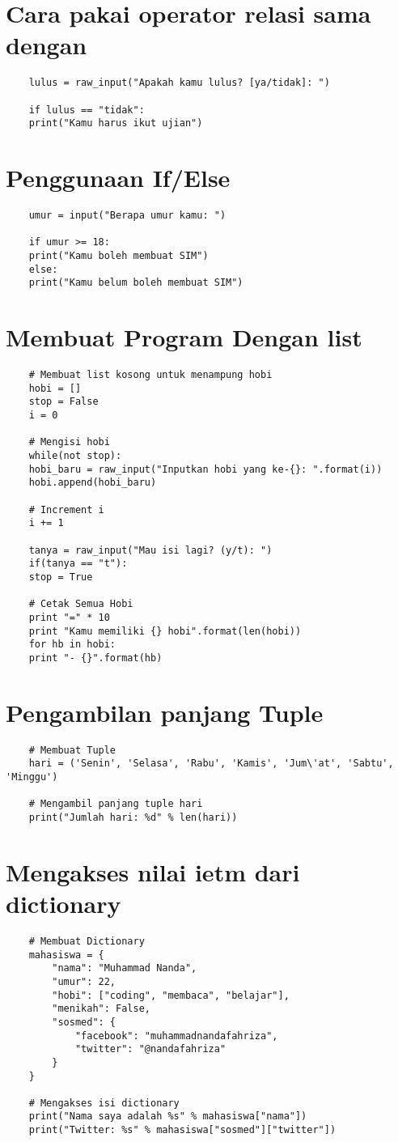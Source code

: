 \documentclass{article}
\begin{document}
\section{Cara pakai operator relasi sama dengan}
\begin{lstlisting}
	lulus = raw_input("Apakah kamu lulus? [ya/tidak]: ")
	
	if lulus == "tidak":
	print("Kamu harus ikut ujian")
\end{lstlisting}

\section{Penggunaan If/Else}
\begin{lstlisting}
	umur = input("Berapa umur kamu: ")
	
	if umur >= 18:
	print("Kamu boleh membuat SIM")
	else:
	print("Kamu belum boleh membuat SIM")
\end{lstlisting}

\section{Membuat Program Dengan list}
\begin{lstlisting}
	# Membuat list kosong untuk menampung hobi
	hobi = []
	stop = False
	i = 0
	
	# Mengisi hobi
	while(not stop):
	hobi_baru = raw_input("Inputkan hobi yang ke-{}: ".format(i))
	hobi.append(hobi_baru)
	
	# Increment i
	i += 1
	
	tanya = raw_input("Mau isi lagi? (y/t): ")
	if(tanya == "t"): 
	stop = True
	
	# Cetak Semua Hobi
	print "=" * 10 
	print "Kamu memiliki {} hobi".format(len(hobi))
	for hb in hobi:
	print "- {}".format(hb)
\end{lstlisting}

\section{Pengambilan panjang Tuple}
\begin{lstlisting}
	# Membuat Tuple
	hari = ('Senin', 'Selasa', 'Rabu', 'Kamis', 'Jum\'at', 'Sabtu', 'Minggu')
	
	# Mengambil panjang tuple hari
	print("Jumlah hari: %d" % len(hari))
\end{lstlisting}

\section{Mengakses nilai ietm dari dictionary}
\begin{lstlisting}
	# Membuat Dictionary
	mahasiswa = {
		"nama": "Muhammad Nanda",
		"umur": 22,
		"hobi": ["coding", "membaca", "belajar"],
		"menikah": False,
		"sosmed": {
			"facebook": "muhammadnandafahriza",
			"twitter": "@nandafahriza"
		} 
	}
	
	# Mengakses isi dictionary
	print("Nama saya adalah %s" % mahasiswa["nama"])
	print("Twitter: %s" % mahasiswa["sosmed"]["twitter"])
\end{lstlisting}
\end{document}
